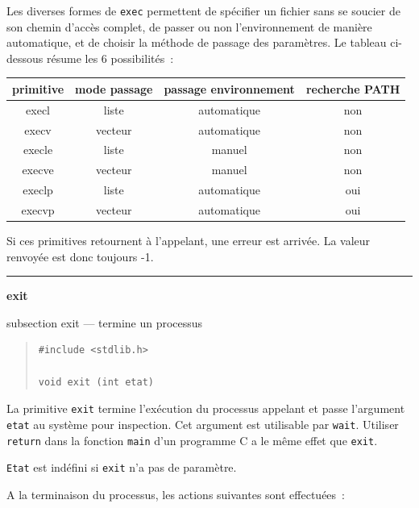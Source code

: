 \documentclass [twoside] {report}
\newcommand {\primitive} [1]
    {
	\phantomsection
	{\large \textbf {#1}}
	\addcontentsline {toc} {subsection} {#1}
    }
\newcommand {\separation}
    {
	\vspace {5mm}
	\nopagebreak
	\hrule
    }
\begin{document}
Les diverses formes de \texttt {exec} permettent de
spécifier un fichier sans se soucier de son chemin
d'accès complet, de passer ou non l'environnement
de manière automatique, et de choisir la méthode
de passage des paramètres. Le tableau ci-dessous
résume les 6 possibilités~:

\begin {center}
    \begin {tabular} {|c|c|c|c|}
	\hline
	\multicolumn {1}{|c|}{primitive} &
	\multicolumn {1}{|c|}{mode passage} &
	\multicolumn {1}{|c|}{passage environnement} &
	\multicolumn {1}{|c|}{recherche PATH} \\
	\hline
	\hline
	execl	&    liste	& automatique &  non \\
	execv	&  vecteur	& automatique &  non \\
	execle	&    liste	&      manuel &  non \\
	execve	&  vecteur	&      manuel &  non \\
	execlp	&    liste	& automatique &  oui \\
	execvp	&  vecteur	& automatique &  oui \\
	\hline
    \end {tabular}
\end {center}


Si ces primitives retournent à l'appelant, une erreur est
arrivée. La valeur renvoyée est donc toujours -1.




\separation
\primitive {exit} --- termine un processus

\begin {quote}
\begin {verbatim}
#include <stdlib.h>

void exit (int etat)
\end{verbatim}
\end {quote}

La primitive \texttt {exit} termine l'exécution du
processus appelant et passe l'argument \texttt {etat} au
système pour inspection. Cet argument est
utilisable par \texttt {wait}. Utiliser \texttt {return} dans la
fonction \texttt {main} d'un programme C a le même effet
que \texttt {exit}.

\texttt {Etat} est indéfini si \texttt {exit} n'a pas de
paramètre.

A la terminaison du processus, les actions
suivantes sont effectuées~:
\end{document}
